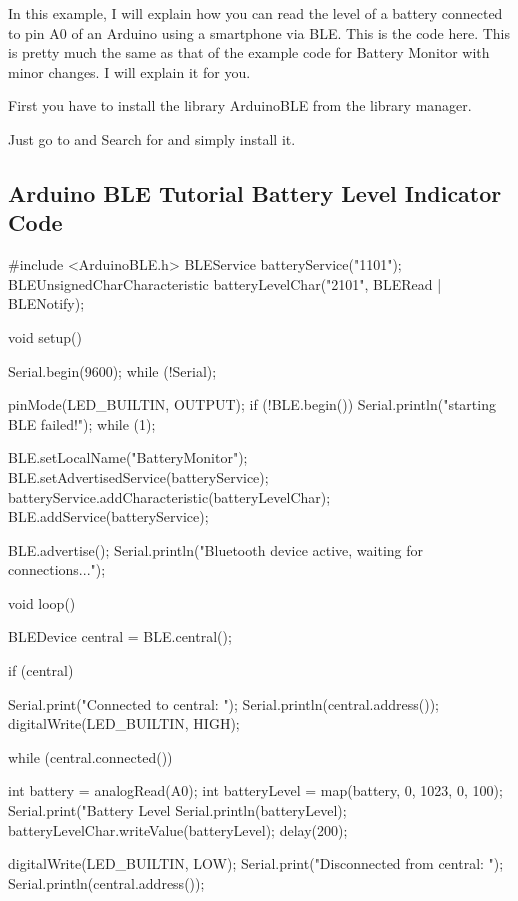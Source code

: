In this example, I will explain how you can read the level of a battery connected to pin A0 of an Arduino using a smartphone via BLE. This is the code here. This is pretty much the same as that of the example code for Battery Monitor with minor changes. I will explain it for you.

First you have to install the library ArduinoBLE from the library manager.

Just go to  and Search for  and simply install it.

\subsection{Arduino BLE Tutorial Battery Level Indicator Code}

\begin{code}
\begin{Arduino}
#include <ArduinoBLE.h>
BLEService batteryService("1101");
BLEUnsignedCharCharacteristic batteryLevelChar("2101", BLERead | BLENotify);

void setup() {
    Serial.begin(9600);
    while (!Serial);
    
    pinMode(LED_BUILTIN, OUTPUT);
    if (!BLE.begin()) 
    {
        Serial.println("starting BLE failed!");
        while (1);
    }
    
    BLE.setLocalName("BatteryMonitor");
    BLE.setAdvertisedService(batteryService);
    batteryService.addCharacteristic(batteryLevelChar);
    BLE.addService(batteryService);
    
    BLE.advertise();
    Serial.println("Bluetooth device active, waiting for connections...");
}

void loop() 
{
    BLEDevice central = BLE.central();
    
    if (central) 
    {
        Serial.print("Connected to central: ");
        Serial.println(central.address());
        digitalWrite(LED_BUILTIN, HIGH);
        
        while (central.connected()) {
            
            int battery = analogRead(A0);
            int batteryLevel = map(battery, 0, 1023, 0, 100);
            Serial.print("Battery Level %
            Serial.println(batteryLevel);
            batteryLevelChar.writeValue(batteryLevel);
            delay(200);
            
        }
    }
    digitalWrite(LED_BUILTIN, LOW);
    Serial.print("Disconnected from central: ");
    Serial.println(central.address());
}
\end{Arduino}

\end{code}


